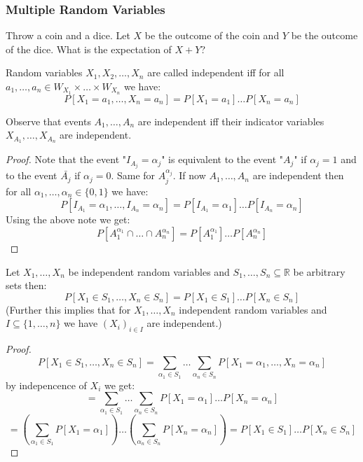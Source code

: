 \subsubsection{Multiple Random Variables}

\begin{example}
	Throw a coin and a dice. Let $X$ be the outcome of the coin and $Y$ be the outcome of the dice. What is the expectation of $X+Y$?
\end{example}

\begin{definition}
	Random variables $X_1, X_2, \dots, X_n$ are called independent iff for all $a_1, \dots, a_n \in W_{X_1} \times \dots \times W_{X_n}$ we have:
	$$P[X_1=a_1, \dots, X_n=a_n] = P[X_1=a_1] \dots P[X_n=a_n]$$
\end{definition}

\begin{lemma}
	Observe that events $A_1, \dots, A_n$ are independent iff their indicator variables $X_{A_1}, \dots, X_{A_n}$ are independent.
\end{lemma}

\begin{proof}
	Note that the event "$I_{A_j} = \alpha_j$" is equivalent to the event "$A_j$" if $\alpha_j = 1$ and to the event $\bar{A_j}$ if $\alpha_j = 0$. Same for $A_j^{\alpha_j}$.
	If now $A_1, \dots, A_n$ are independent then for all $\alpha_1, \dots, \alpha_n \in \{0,1\}$ we have:
	$$P[I_{A_1} = \alpha_1, \dots, I_{A_n} = \alpha_n] = P[I_{A_1} = \alpha_1] \dots P[I_{A_n} = \alpha_n]$$
	Using the above note we get:
	$$P[A_1^{\alpha_1} \cap \dots \cap A_n^{\alpha_n}] = P[A_1^{\alpha_1}] \dots P[A_n^{\alpha_n}]$$
\end{proof}

\begin{lemma}
	Let $X_1, \dots, X_n$ be independent random variables and $S_1, \dots, S_n \subseteq \mathbb{R}$ be arbitrary sets then:
	$$P[X_1 \in S_1, \dots, X_n \in S_n] = P[X_1 \in S_1] \dots P[X_n \in S_n]$$
	(Further this implies that for $X_1, \dots, X_n$ independent random variables and $I \subseteq \{1, \dots, n\}$ we have $(X_i)_{i \in I}$ are independent.)
\end{lemma}

\begin{proof}
	$$P[X_1\in S_1, \dots , X_n\in S_n] = \sum_{\alpha_1 \in S_1} \dots \sum_{\alpha_n \in S_n} P[X_1=\alpha_1, \dots, X_n=\alpha_n]$$
	by indepencence of $X_i$ we get:
	$$= \sum_{\alpha_1 \in S_1} \dots \sum_{\alpha_n \in S_n} P[X_1=\alpha_1] \dots P[X_n=\alpha_n]$$
	$$= (\sum_{\alpha_1 \in S_1} P[X_1=\alpha_1]) \dots (\sum_{\alpha_n \in S_n} P[X_n=\alpha_n]) = P[X_1\in S_1] \dots P[X_n\in S_n]$$
\end{proof}

